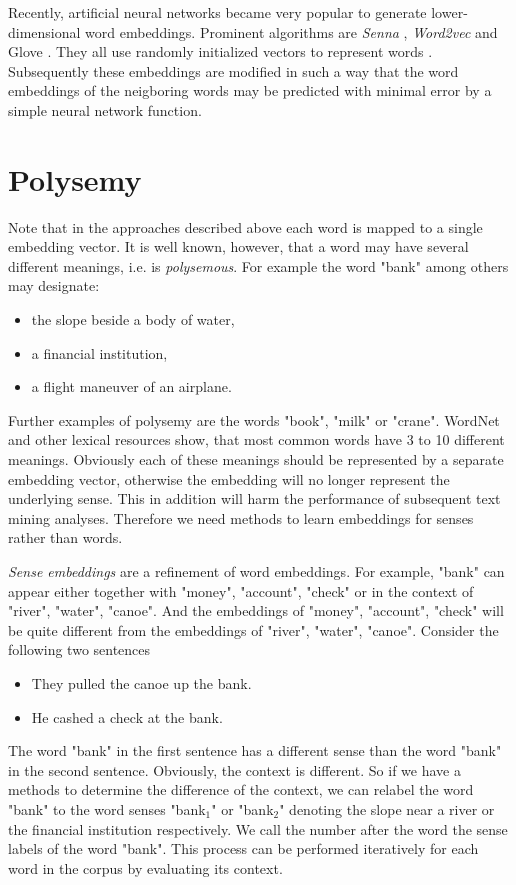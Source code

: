 Recently, artificial neural networks became very popular to generate lower-dimensional word embeddings. Prominent algorithms are \emph{Senna} \citep{CollobertWeston2008}, \emph{Word2vec} \citep{MikolovSutskeverEtAl2013} and Glove \citep{PenningtonSocherEtAl2014}. They all use randomly initialized vectors to represent words . Subsequently these embeddings are modified in such a way that the word embeddings of the neigboring words may be predicted with minimal error by a simple neural network function. 

\section{Polysemy}

Note that in the approaches described above each word is mapped to a single embedding vector. It is well known, however, that a word may have several different meanings, i.e. is \emph{polysemous}. For example the word "bank" among others may designate: 
\begin{itemize}
	\item the slope beside a body of water,
	\item a financial institution,
	\item a flight maneuver of an airplane.
\end{itemize}
Further examples of polysemy are the words "book", "milk" or "crane".
WordNet \citep{Fellbaum1998} and other lexical resources show, that most common words have 3 to 10 different meanings.
 Obviously each of these meanings should be represented by a separate embedding vector, otherwise the embedding will no longer represent the underlying sense. This in addition will harm the performance of subsequent text mining analyses. Therefore we need methods to learn  embeddings for senses rather than words.


\emph{Sense embeddings} are a refinement of word embeddings. For example, "bank" can appear either together with "money", "account", "check" or in the context of "river", "water", "canoe". And the embeddings of "money", "account", "check" will be quite different from the embeddings of "river", "water", "canoe". Consider the following two sentences 
\begin{itemize}
	\item They pulled the canoe up the bank.
	\item He cashed a check at the bank.
\end{itemize}
The word "bank" in the first sentence has a different sense than the word "bank" in the second sentence. Obviously, the context is different. 
So if we have a methods to determine the difference of the context, we can relabel the word "bank" to the word senses "bank$_1$" or "bank$_2$" denoting the slope near a river or the financial institution respectively. We call the number after the word the sense labels of the word "bank". This process can be performed iteratively for each word in the corpus by evaluating its context.

